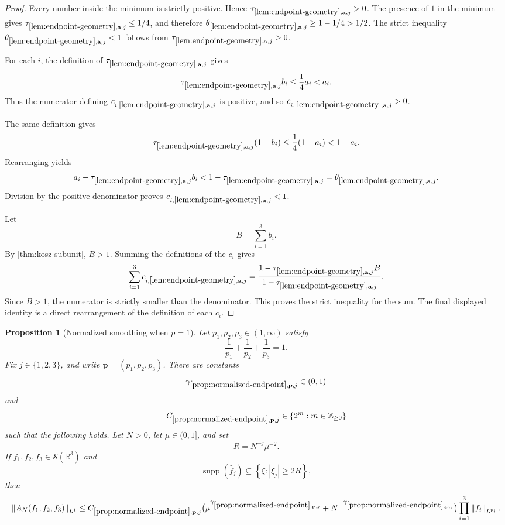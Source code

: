 \documentclass[11pt]{article}
\newtheorem{proposition}[theorem]{Proposition}
\newcommand{\R}{\mathbb{R}}
\newcommand{\Sch}{\mathcal{S}}
\newcommand{\supp}{\operatorname{supp}}
\newcommand{\norm}[2]{\left\lVert #1\right\rVert_{#2}}
\newcommand{\Cst}[2]{C_{\ref{#1},#2}}
\newcommand{\Gam}[2]{\gamma_{\ref{#1},#2}}
\newcommand{\abs}[1]{\left|#1\right|}
\newcommand{\set}[1]{\left\{#1\right\}}
\newcommand{\indices}{\{1,2,3\}}
\begin{document}
\begin{proof}
Every number inside the minimum is strictly positive.  Hence \(\tau_{\ref{lem:endpoint-geometry},\mathbf a,j}>0\).  The presence of \(1\) in the minimum gives \(\tau_{\ref{lem:endpoint-geometry},\mathbf a,j}\leq1/4\), and therefore \(\theta_{\ref{lem:endpoint-geometry},\mathbf a,j}\geq1-1/4>1/2\).  The strict inequality \(\theta_{\ref{lem:endpoint-geometry},\mathbf a,j}<1\) follows from \(\tau_{\ref{lem:endpoint-geometry},\mathbf a,j}>0\).

For each \(i\), the definition of \(\tau_{\ref{lem:endpoint-geometry},\mathbf a,j}\) gives
\[
\tau_{\ref{lem:endpoint-geometry},\mathbf a,j}b_i
\leq
\frac14 a_i<a_i.
\]
Thus the numerator defining \(c_{i,\ref{lem:endpoint-geometry},\mathbf a,j}\) is positive, and so \(c_{i,\ref{lem:endpoint-geometry},\mathbf a,j}>0\).

The same definition gives
\[
\tau_{\ref{lem:endpoint-geometry},\mathbf a,j}(1-b_i)
\leq
\frac14(1-a_i)<1-a_i.
\]
Rearranging yields
\[
a_i-\tau_{\ref{lem:endpoint-geometry},\mathbf a,j}b_i
<
1-\tau_{\ref{lem:endpoint-geometry},\mathbf a,j}
=
\theta_{\ref{lem:endpoint-geometry},\mathbf a,j}.
\]
Division by the positive denominator proves \(c_{i,\ref{lem:endpoint-geometry},\mathbf a,j}<1\).

Let
\[
B=\sum_{i=1}^{3}b_i.
\]
By \cref{thm:kosz-subunit}, \(B>1\).  Summing the definitions of the \(c_i\) gives
\[
\sum_{i=1}^{3}c_{i,\ref{lem:endpoint-geometry},\mathbf a,j}
=
\frac{1-\tau_{\ref{lem:endpoint-geometry},\mathbf a,j}B}
{1-\tau_{\ref{lem:endpoint-geometry},\mathbf a,j}}.
\]
Since \(B>1\), the numerator is strictly smaller than the denominator.  This proves the strict inequality for the sum.  The final displayed identity is a direct rearrangement of the definition of each \(c_i\).
\end{proof}

\begin{proposition}[Normalized smoothing when \(p=1\)]\label{prop:normalized-endpoint}
Let \(p_1,p_2,p_3\in(1,\infty)\) satisfy
\[
\frac1{p_1}+\frac1{p_2}+\frac1{p_3}=1.
\]
Fix \(j\in\indices\), and write \(\mathbf p=(p_1,p_2,p_3)\).  There are constants
\[
\Gam{prop:normalized-endpoint}{\mathbf p,j}\in(0,1)
\]
and
\[
\Cst{prop:normalized-endpoint}{\mathbf p,j}\in\set{2^m:m\in\mathbb Z_{\geq0}}
\]
such that the following holds.  Let \(N>0\), let \(\mu\in(0,1]\), and set
\[
R=N^{-j}\mu^{-2}.
\]
If \(f_1,f_2,f_3\in\Sch(\R^3)\) and
\[
\supp(\widehat f_j)\subseteq\set{\xi:\abs{\xi_j}\geq2R},
\]
then
\[
\norm{A_N(f_1,f_2,f_3)}{L^1}
\leq
\Cst{prop:normalized-endpoint}{\mathbf p,j}
\bigl(\mu^{\Gam{prop:normalized-endpoint}{\mathbf p,j}}
+N^{-\Gam{prop:normalized-endpoint}{\mathbf p,j}}\bigr)
\prod_{i=1}^{3}\norm{f_i}{L^{p_i}}.
\]
\end{proposition}
\end{document}
